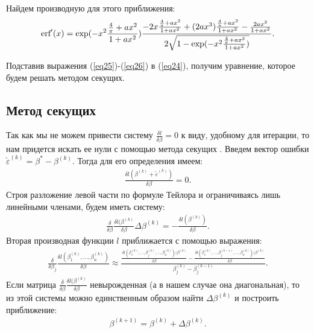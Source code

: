 Найдем производную для этого приближения:
\begin{eqnarray}
    \label{eq26}\textup{erf}'(x) = \exp(-x^2 \frac{\frac{4}{\pi}+ax^2}{1+ax^2}) \frac{-2x\frac{\frac{4}{\pi}+ax^2}{1+ax^2}+(2ax^3)\frac{\frac{4}{\pi}+ax^2}{1+ax^2}-\frac{2ax^3}{1+ax^2}}{2\sqrt{1- \exp(-x^2 \frac{\frac{4}{\pi}+ax^2}{1+ax^2})}}.
\end{eqnarray}

Подставив  выражения (\ref{eq25})-(\ref{eq26}) в (\ref{eq24}), получим уравнение, которое будем решать методом секущих.


\subsection{Метод секущих}\label{sec4_2}
Так как мы не можем привести систему $ \frac{\delta l}{\delta \beta}=0$ к виду, удобному для итерации, то нам придется искать ее нули с помощью метода секущих \cite{NumericalMethods}.
Введем вектор ошибки $\check{\varepsilon}^{(k)}=\beta^{*}-\beta^{(k)}$. Тогда для его определения имеем:
\begin{eqnarray}
    \frac{\delta l (\beta^{(k)}+\check{\varepsilon}^{(k)})}{\delta \beta}=0.
\end{eqnarray}
Строя разложение левой части по формуле Тейлора и ограничиваясь лишь линейными членами\cite{NumericalMethods}, будем иметь систему:
\begin{eqnarray}
    \frac{\delta }{\delta \beta}\frac{\delta l (\beta^{(k)}}{\delta \beta}\Delta \beta^{(k)}=-\frac{\delta l (\beta^{(k)})}{\delta \beta}.
\end{eqnarray}
Вторая производная функции $l$ приближается с помощью выражения:
\begin{eqnarray}
    \frac{\delta }{\delta \beta_j}\frac{\delta l(\beta_1^{(k)},\dots, \beta_n^{(k)}) }{\delta \beta}\approx \frac{\frac{\delta l(\beta_1^{(k)},\dots,\beta_j^{(k)},\dots, \beta_n^{(k)}) (\beta^{(k)}}{\delta \beta}-\frac{\delta l(\beta_1^{(k)},\dots,\beta_j^{(k-1)},\dots, \beta_n^{(k)}) (\beta^{(k)}}{\delta \beta}}{\beta_j^{(k)}-\beta_j^{(k-1)}}.
\end{eqnarray}
Если матрица $\frac{\delta }{\delta \beta}\frac{\delta l (\beta^{(k)}}{\delta \beta}$ невырожденная (а в нашем случае она диагональная), то из этой системы можно единственным образом найти $\Delta \beta^{(k)}$ и построить приближение:
\begin{eqnarray}
    \beta^{(k+1)}=\beta^{(k)}+\Delta \beta^{(k)}.
\end{eqnarray}

